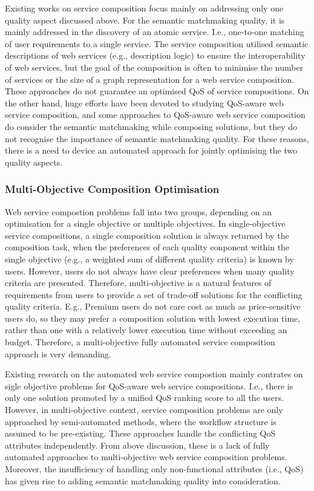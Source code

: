 Existing works on service composition focus mainly on addressing only one quality aspect discussed above. For the semantic matchmaking quality, it is mainly addressed in the discovery of an atomic service. I.e., one-to-one matching of user requirements to a single service. The service composition \cite{bansal2016generalized,boustil2014semantic,mier2015integrated} utilised semantic descriptions of web services (e.g., description logic) to ensure the interoperability of web services, but the goal of the composition is often to minimise the number of services or the size of a graph representation for a web service composition. These approaches do not guarantee an optimised QoS of service compositions. On the other hand, huge efforts have been devoted to studying QoS-aware web service composition, and some approaches to QoS-aware web service composition do consider the semantic matchmaking while composing solutions, but they do not recognise the importance of semantic matchmaking quality. For these reasons, there is a need to device an automated approach for jointly optimising the two quality aspects.


\subsubsection{Multi-Objective Composition Optimisation}
Web service compostion problems fall into two groups, depending on an optimisation for a single objective or multiple objectives. In single-objective service compositions, a single composition solution is always returned by the composition task, when the preferences of each quality conponent within the single objective (e.g., a weighted sum of different quality criteria) is known by users. However, users do not always have clear preferences when many quality criteria are presented. Therefore, multi-objective is a natural features of requirements from users to provide a set of trade-off solutions for the conflicting quality criteria. E.g., Premium users do not care cost as much as price-sensitive users do, so they may prefer a composition solution with lowest execution time,  rather than one with a relatively lower execution time without exceeding an budget. Therefore, a multi-objective  fully automated service composition approach is very demanding.

Existing research on the automated web service compostion mainly contrates on sigle objective problems for QoS-aware web service compositions. I.e., there is only one solution promoted by a unified QoS ranking score to all the users. However, in multi-objective context, service composition problems  \cite{liu2005dynamic,wada2012e3,yin2014hybrid} are only approached by semi-automated methods, where the workflow structure is assumed to be pre-existing. These approaches handle the conflicting QoS attributes independently. From above discussion, these is a lack of fully automated approaches to multi-objective web service composition problems. Moreover, the insufficiency of handling only non-functional attributes (i.e., QoS) has given rise to adding semantic matchmaking quality into consideration.

